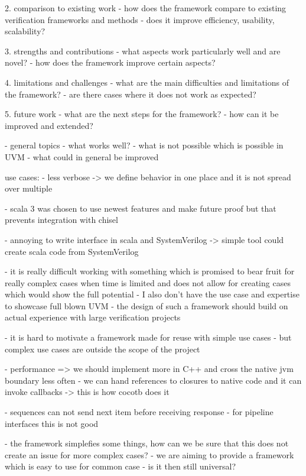 2. comparison to existing work
  - how does the framework compare to existing verification frameworks and methods 
  - does it improve efficiency, usability, scalability?

3. strengths and contributions
  - what aspects work particularly well and are novel?
  - how does the framework improve certain aspects?

4. limitations and challenges
  - what are the main difficulties and limitations of the framework?
  - are there cases where it does not work as expected?

5. future work
  - what are the next steps for the framework?
  - how can it be improved and extended?

- general topics
  - what works well?
  - what is not possible which is possible in UVM
  - what could in general be improved



use cases:
- less verbose -> we define behavior in one place and it is not spread over multiple

- scala 3 was chosen to use newest features and make future proof but that prevents integration with chisel

- annoying to write interface in scala and SystemVerilog -> simple tool could create scala code from SystemVerilog

- it is really difficult working with something which is promised to bear fruit for really complex cases when time is
limited and does not allow for creating cases which would show the full potential
- I also don't have the use case and expertise to showcase full blown UVM
- the design of such a framework should build on actual experience with large verification projects

- it is hard to motivate a framework made for reuse with simple use cases
- but complex use cases are outside the scope of the project

- performance => we should implement more in C++ and cross the native jvm boundary less often
- we can hand references to closures to native code and it can invoke callbacks -> this is how cocotb does it

- sequences can not send next item before receiving response
- for pipeline interfaces this is not good


- the framework simplefies some things, how can we be sure that this does not create an issue for more complex cases?
- we are aiming to provide a framework which is easy to use for common case 
- is it then still universal?

